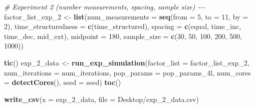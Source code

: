 \documentclass[
12pt, %
twoside,
english]{guelphthesis}
\newenvironment{Shaded}{\begin{snugshade}}{\end{snugshade}}
\newcommand{\AttributeTok}[1]{\textcolor[rgb]{0.13,0.29,0.53}{#1}}
\newcommand{\CommentTok}[1]{\textcolor[rgb]{0.56,0.35,0.01}{\textit{#1}}}
\newcommand{\DecValTok}[1]{\textcolor[rgb]{0.00,0.00,0.81}{#1}}
\newcommand{\FunctionTok}[1]{\textcolor[rgb]{0.13,0.29,0.53}{\textbf{#1}}}
\newcommand{\NormalTok}[1]{#1}
\newcommand{\OtherTok}[1]{\textcolor[rgb]{0.56,0.35,0.01}{#1}}
\newcommand{\StringTok}[1]{\textcolor[rgb]{0.31,0.60,0.02}{#1}}
\begin{document}
\begin{Shaded}
\begin{Highlighting}[numbers=left,,]
\CommentTok{\# Experiment 2 (number measurements, spacing,  sample size) {-}{-}{-}}
\NormalTok{factor\_list\_exp\_2 }\OtherTok{\textless{}{-}} \FunctionTok{list}\NormalTok{(}\StringTok{\textquotesingle{}num\_measurements\textquotesingle{}} \OtherTok{=} \FunctionTok{seq}\NormalTok{(}\AttributeTok{from =} \DecValTok{5}\NormalTok{, }\AttributeTok{to =} \DecValTok{11}\NormalTok{, }\AttributeTok{by =} \DecValTok{2}\NormalTok{), }
                          \StringTok{\textquotesingle{}time\_structuredness\textquotesingle{}} \OtherTok{=} \FunctionTok{c}\NormalTok{(}\StringTok{\textquotesingle{}time\_structured\textquotesingle{}}\NormalTok{),}
                          \StringTok{\textquotesingle{}spacing\textquotesingle{}} \OtherTok{=} \FunctionTok{c}\NormalTok{(}\StringTok{\textquotesingle{}equal\textquotesingle{}}\NormalTok{, }\StringTok{\textquotesingle{}time\_inc\textquotesingle{}}\NormalTok{, }\StringTok{\textquotesingle{}time\_dec\textquotesingle{}}\NormalTok{, }\StringTok{\textquotesingle{}mid\_ext\textquotesingle{}}\NormalTok{),}
                          \StringTok{\textquotesingle{}midpoint\textquotesingle{}} \OtherTok{=} \DecValTok{180}\NormalTok{, }
                          \StringTok{\textquotesingle{}sample\_size\textquotesingle{}} \OtherTok{=} \FunctionTok{c}\NormalTok{(}\DecValTok{30}\NormalTok{, }\DecValTok{50}\NormalTok{, }\DecValTok{100}\NormalTok{, }\DecValTok{200}\NormalTok{, }\DecValTok{500}\NormalTok{, }\DecValTok{1000}\NormalTok{))}

\FunctionTok{tic}\NormalTok{()}
\NormalTok{exp\_2\_data }\OtherTok{\textless{}{-}} \FunctionTok{run\_exp\_simulation}\NormalTok{(}\AttributeTok{factor\_list =}\NormalTok{ factor\_list\_exp\_2, }\AttributeTok{num\_iterations =}\NormalTok{ num\_iterations, }\AttributeTok{pop\_params =}\NormalTok{ pop\_params\_4l, }
                                 \AttributeTok{num\_cores =} \FunctionTok{detectCores}\NormalTok{(), }\AttributeTok{seed =}\NormalTok{ seed)}
\FunctionTok{toc}\NormalTok{()}

\FunctionTok{write\_csv}\NormalTok{(}\AttributeTok{x =}\NormalTok{ exp\_2\_data, }\AttributeTok{file =} \StringTok{\textquotesingle{}Desktop/exp\_2\_data.csv\textquotesingle{}}\NormalTok{)}


\end{Highlighting}
\end{Shaded}
\end{document}
